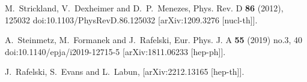 \documentclass[Universe,article,submit,moreauthors,pdftex]{Definitions/mdpi}
\begin{document}
\begin{thebibliography}{99}
M.~Strickland, V.~Dexheimer and D.~P.~Menezes,
Phys. Rev. D \textbf{86} (2012), 125032
doi:10.1103/PhysRevD.86.125032
[arXiv:1209.3276 [nucl-th]].

A.~Steinmetz, M.~Formanek and J.~Rafelski,
Eur. Phys. J. A \textbf{55} (2019) no.3, 40
doi:10.1140/epja/i2019-12715-5
[arXiv:1811.06233 [hep-ph]].

J.~Rafelski, S.~Evans and L.~Labun,
[arXiv:2212.13165 [hep-th]].
 

\end{thebibliography}

\end{document}
